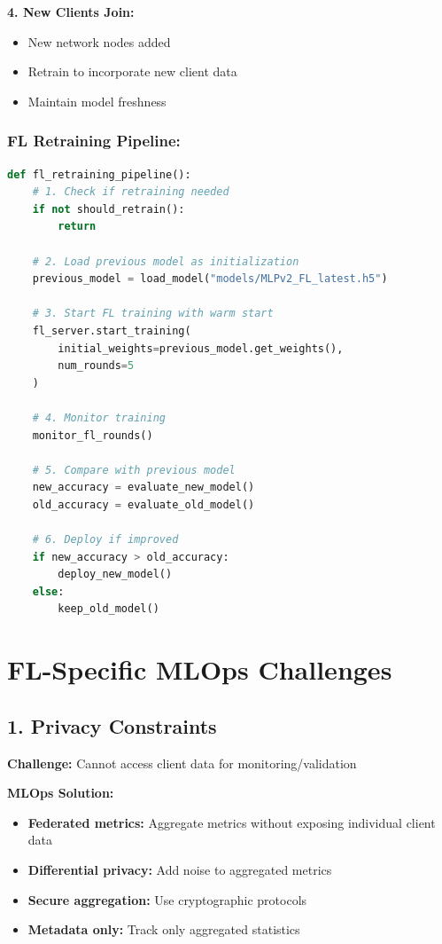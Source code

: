 \documentclass[12pt]{article}
\begin{document}
\textbf{4. New Clients Join:}
\begin{itemize}
    \item New network nodes added
    \item Retrain to incorporate new client data
    \item Maintain model freshness
\end{itemize}

\subsubsection{FL Retraining Pipeline:}

\begin{lstlisting}[language=Python]
def fl_retraining_pipeline():
    # 1. Check if retraining needed
    if not should_retrain():
        return
    
    # 2. Load previous model as initialization
    previous_model = load_model("models/MLPv2_FL_latest.h5")
    
    # 3. Start FL training with warm start
    fl_server.start_training(
        initial_weights=previous_model.get_weights(),
        num_rounds=5
    )
    
    # 4. Monitor training
    monitor_fl_rounds()
    
    # 5. Compare with previous model
    new_accuracy = evaluate_new_model()
    old_accuracy = evaluate_old_model()
    
    # 6. Deploy if improved
    if new_accuracy > old_accuracy:
        deploy_new_model()
    else:
        keep_old_model()
\end{lstlisting}

\section{FL-Specific MLOps Challenges}

\subsection{1. Privacy Constraints}

\textbf{Challenge:} Cannot access client data for monitoring/validation

\textbf{MLOps Solution:}
\begin{itemize}
    \item \textbf{Federated metrics:} Aggregate metrics without exposing individual client data
    \item \textbf{Differential privacy:} Add noise to aggregated metrics
    \item \textbf{Secure aggregation:} Use cryptographic protocols
    \item \textbf{Metadata only:} Track only aggregated statistics
\end{itemize}
\end{document}
